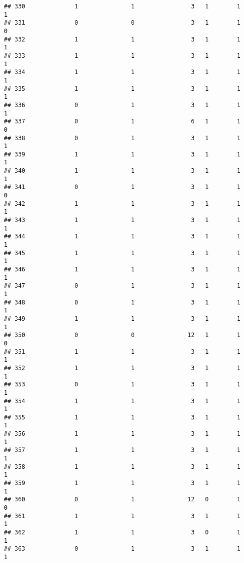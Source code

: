 \documentclass[]{article}
\begin{document}
\begin{verbatim}
## 330              1               1                3   1        1        1
## 331              0               0                3   1        1        0
## 332              1               1                3   1        1        1
## 333              1               1                3   1        1        1
## 334              1               1                3   1        1        1
## 335              1               1                3   1        1        1
## 336              0               1                3   1        1        1
## 337              0               1                6   1        1        0
## 338              0               1                3   1        1        1
## 339              1               1                3   1        1        1
## 340              1               1                3   1        1        1
## 341              0               1                3   1        1        0
## 342              1               1                3   1        1        1
## 343              1               1                3   1        1        1
## 344              1               1                3   1        1        1
## 345              1               1                3   1        1        1
## 346              1               1                3   1        1        1
## 347              0               1                3   1        1        1
## 348              0               1                3   1        1        1
## 349              1               1                3   1        1        1
## 350              0               0               12   1        1        0
## 351              1               1                3   1        1        1
## 352              1               1                3   1        1        1
## 353              0               1                3   1        1        1
## 354              1               1                3   1        1        1
## 355              1               1                3   1        1        1
## 356              1               1                3   1        1        1
## 357              1               1                3   1        1        1
## 358              1               1                3   1        1        1
## 359              1               1                3   1        1        1
## 360              0               1               12   0        1        0
## 361              1               1                3   1        1        1
## 362              1               1                3   0        1        1
## 363              0               1                3   1        1        1

\end{verbatim}
\end{document}
